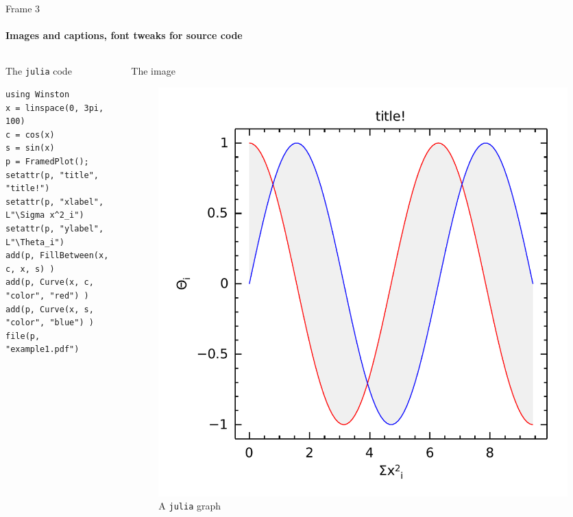 \documentclass[presentation]{beamer}
\begin{document}
\begin{frame}[fragile,label=sec-1-4]{Frame 3}
 \framesubtitle{Images and captions, font tweaks for source code}

\begin{columns}
\begin{column}{0.6\textwidth}
\begin{block}{The \texttt{julia} code}

\footnotesize

\begin{verbatim}
using Winston
x = linspace(0, 3pi, 100)
c = cos(x)
s = sin(x)
p = FramedPlot();
setattr(p, "title", "title!")
setattr(p, "xlabel", L"\Sigma x^2_i")
setattr(p, "ylabel", L"\Theta_i")
add(p, FillBetween(x, c, x, s) )
add(p, Curve(x, c, "color", "red") )
add(p, Curve(x, s, "color", "blue") )
file(p, "example1.pdf")
\end{verbatim}

\normalsize
\end{block}
\end{column}
\begin{column}{0.4\textwidth}
\begin{block}{The image}

\begin{figure}[htb]
\centering
\includegraphics[width=.9\linewidth]{example1.pdf}
\caption{A \texttt{julia} graph}
\end{figure}
\end{block}
\end{column}
\end{columns}
\end{frame}
\end{document}
